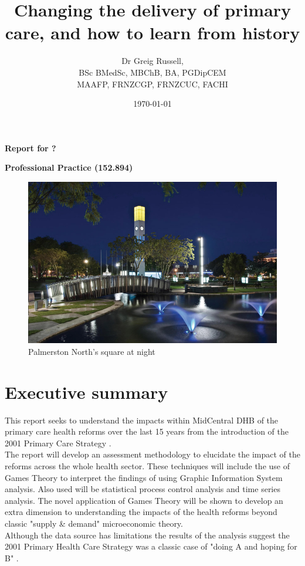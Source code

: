 \documentclass[11pt,a4paper]{article}
\title{\textbf{Changing the delivery of primary care, and how to learn from history}}
\author{Dr Greig Russell, \\ BSc BMedSc, MBChB, BA, PGDipCEM \\ MAAFP, FRNZCGP, FRNZCUC, FACHI}
\date{\today}
\begin{document}
\maketitle
\Large{\textbf{Report for ?}}

\Large{\textbf{Professional Practice (152.894)}}
\newline
\newline
\newline
\begin{figure}[htp]
\centering
\includegraphics[scale=0.6]{PN.png}
\caption{Palmerston North's square at night}
\label{}
\end{figure}

\pagebreak
\section{Executive summary}
This report seeks to understand the impacts within MidCentral DHB of the primary care health reforms over the last 15 years from the introduction of the 2001 Primary Care Strategy \citep{king2001primary}.\\

The report will develop an assessment methodology to elucidate the impact of the reforms across the whole health sector. These techniques will include the use of Games Theory to interpret the findings of using Graphic Information System analysis. Also used will be statistical process control analysis and time series analysis. The novel application of Games Theory will be shown to develop an extra dimension to understanding the impacts of the health reforms beyond classic "supply \& demand" microeconomic theory.\\

Although the data source has limitations the results of the analysis suggest the 2001 Primary Health Care Strategy was a classic case of "doing A and hoping for B" \citep{kerr1995folly}. \\
\end{document}
